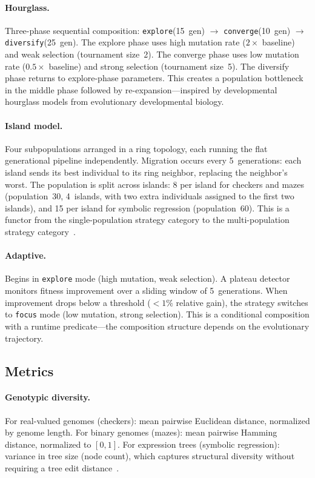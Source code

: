 \documentclass[sigconf,anonymous]{acmart}
\begin{document}
\paragraph{Hourglass.}
Three-phase sequential composition: \texttt{explore}(15~gen) $\to$ \texttt{converge}(10~gen) $\to$ \texttt{diversify}(25~gen). The explore phase uses high mutation rate ($2\times$ baseline) and weak selection (tournament size~2). The converge phase uses low mutation rate ($0.5\times$ baseline) and strong selection (tournament size~5). The diversify phase returns to explore-phase parameters. This creates a population bottleneck in the middle phase followed by re-expansion---inspired by developmental hourglass models from evolutionary developmental biology.

\paragraph{Island model.}
Four subpopulations arranged in a ring topology, each running the flat generational pipeline independently. Migration occurs every 5~generations: each island sends its best individual to its ring neighbor, replacing the neighbor's worst. The population is split across islands: 8 per island for checkers and mazes (population~30, 4~islands, with two extra individuals assigned to the first two islands), and 15 per island for symbolic regression (population~60). This is a functor from the single-population strategy category to the multi-population strategy category~\cite{whitley1999island, skolicki2005influence}.

\paragraph{Adaptive.}
Begins in \texttt{explore} mode (high mutation, weak selection). A plateau detector monitors fitness improvement over a sliding window of 5~generations. When improvement drops below a threshold ($<1\%$ relative gain), the strategy switches to \texttt{focus} mode (low mutation, strong selection). This is a conditional composition with a runtime predicate---the composition structure depends on the evolutionary trajectory.

\subsection{Metrics}

\paragraph{Genotypic diversity.}
For real-valued genomes (checkers): mean pairwise Euclidean distance, normalized by genome length. For binary genomes (mazes): mean pairwise Hamming distance, normalized to $[0, 1]$. For expression trees (symbolic regression): variance in tree size (node count), which captures structural diversity without requiring a tree edit distance~\cite{burke2004diversity}.
\end{document}
